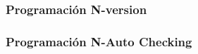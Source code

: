 \begin{comment}
\begin{figure}[h]
 \centering
 \begin{tikzpicture}[node distance=1cm, auto,]
   \tikzset{
   cuadro/.style={
           rectangle,
           draw=black,
           text width=6.5em,
           minimum height=2em,
           text centered},
    arrow/.style={
           ->,
           thick,
           shorten <=2pt,
           shorten >=2pt,}	
    }
       
  \tikzstyle{circulo} = [draw, fill=black, circle, node distance=1cm, minimum size=5pt, inner 
sep=3pt]
    
  \node[inner, sep=5pt] (input1){Entrada 1};
  \node[inner, sep=5pt, below=0.5cm of input1] (input2){Entrada 2};
  \node[inner, sep=5pt, below=0.5cm of input2] (puntos1){...};
  \node[inner, sep=5pt, below=0.5cm of puntos1] (inputn){Entrada n};
  \node[cuadro, right=0.5cm of input1] (version1){Versión 1};
  \node[cuadro, right=0.5cm of input2] (version2){Versión 2};
  \node[inner, sep=5pt, right=2cm of puntos1](puntos2){...};
  \node[cuadro, right=0.5cm of inputn] (versionn){Version n};
  
  \node[cuadro, above=1cm of version1] (check) {Memoria Checkpoint};
  \node[cuadro, right=1cm of version2] (switch) {Swith n a 1};
  \node[inner, sep=0pt, right=1cm of switch](ghost1){};
  \node[cuadro, below=0.5cm of ghost1](test){Test de aceptación};
  
  \node[inner, sep=0pt, right=0.5cm of ghost1](output){Salida};
 
  \draw[arrow] (input1)--(version1);
  \draw[arrow] (input2)--(version2);
  \draw[arrow] (inputn)--(versionn);
  \draw[arrow] (version1)-|(switch.west);
  \draw[arrow] (version2)--(switch);
  \draw[arrow] (versionn)-|(switch.west);
  \draw[arrow] (ghost1)--(test);
  \draw[arrow] (switch)--(output);
  
  \draw[arrow, dashed] (check.-40) -- (version1.30);
  \draw[arrow, dashed] (version1.150) -- (check.-145);
  
  

 \end{tikzpicture}
 \caption{Configuración de bloques de recuperación}
 \label{fig:repPares}
\end{figure}
\end{comment}

\subsubsection{Programación N-version}

\subsubsection{Programación N-Auto Checking}


